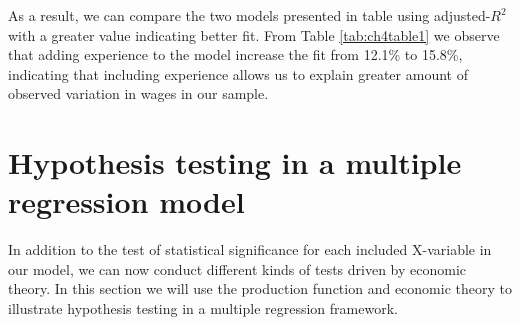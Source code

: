 \documentclass[
]{book}
\theoremstyle{definition}
\theoremstyle{definition}
\theoremstyle{definition}
\theoremstyle{definition}
\theoremstyle{remark}
\begin{document}
As a result, we can compare the two models presented in table using adjusted-\(R^2\) with a greater value indicating better fit. From Table \ref{tab:ch4table1} we observe that adding experience to the model increase the fit from 12.1\% to 15.8\%, indicating that including experience allows us to explain greater amount of observed variation in wages in our sample.

\hypertarget{hypothesis-testing-in-a-multiple-regression-model}{%
\section{Hypothesis testing in a multiple regression model}\label{hypothesis-testing-in-a-multiple-regression-model}}

In addition to the test of statistical significance for each included X-variable in our model, we can now conduct different kinds of tests driven by economic theory. In this section we will use the production function and economic theory to illustrate hypothesis testing in a multiple regression framework.
\end{document}
